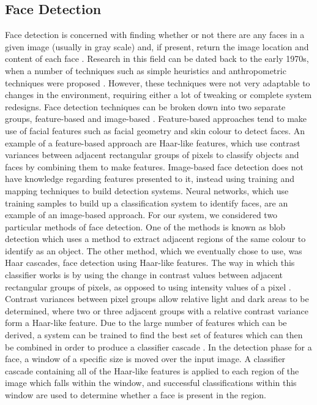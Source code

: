 \documentclass[conference]{IEEEtran}
\begin{document}
\subsection{Face Detection}
Face detection is concerned with finding whether or not there are any faces in a given image (usually in gray scale) and, if present, return the image location and content of each face \cite{yang2008face}. Research in this field can be dated back to the early 1970s, when a number of techniques such as simple heuristics and anthropometric techniques were proposed \cite{hjelmaas2001face}. However, these techniques were not very adaptable to changes in the environment, requiring either a lot of tweaking or complete system redesigns. Face detection techniques can be broken down into two separate groups, feature-based and image-based \cite{hjelmaas2001face}. Feature-based approaches tend to make use of facial features such as facial geometry and skin colour to detect faces. An example of a feature-based approach are Haar-like features, which use contrast variances between adjacent rectangular groups of pixels to classify objects and faces by combining them to make features. Image-based face detection does not have knowledge regarding features presented to it, instead using training and mapping techniques to build detection systems. Neural networks, which use training samples to build up a classification system to identify faces, are an example of an image-based approach. For our system, we considered two particular methods of face detection. One of the methods is known as blob detection which uses a method to extract adjacent regions of the same colour to identify as an object. The other method, which we eventually chose to use, was Haar cascades, face detection using Haar-like features. The way in which this classifier works is by using the change in contrast values between adjacent rectangular groups of pixels, as opposed to using intensity values of a pixel \cite{wilson2006facial}. Contrast variances between pixel groups allow relative light and dark areas to be determined, where two or three adjacent groups with a relative contrast variance form a Haar-like feature. Due to the large number of features which can be derived, a system can be trained to find the best set of features which can then be combined in order to produce a classifier cascade \cite{viola2004robust}. In the detection phase for a face, a window of a specific size is moved over the input image. A classifier cascade containing all of the Haar-like features is applied to each region of the image which falls within the window, and successful classifications within this window are used to determine whether a face is present in the region.
\end{document}

